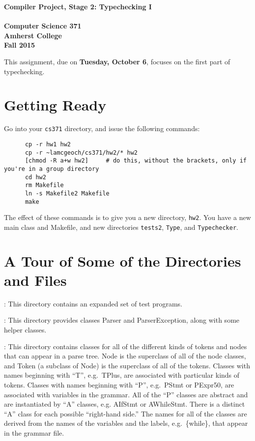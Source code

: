 \documentclass[11pt]{article}
\begin{document}
\begin{center}
\Large \bf Compiler Project, Stage 2: Typechecking  I\\ \mbox{} \\
\large Computer Science 371 \\
\large Amherst College \\
\large Fall 2015
\end{center}

This assignment, due on {\bf Tuesday, October 6}, focuses on the first part of typechecking.

\section{Getting Ready}

Go into your \verb'cs371' directory, and issue the following commands:
\begin{verbatim}
      cp -r hw1 hw2                   
      cp -r ~lamcgeoch/cs371/hw2/* hw2
      [chmod -R a+w hw2]     # do this, without the brackets, only if you're in a group directory 
      cd hw2
      rm Makefile
      ln -s Makefile2 Makefile
      make
\end{verbatim}
The effect of these commands is to give you a new directory, \verb'hw2'.  You have a new main class and Makefile, and new directories \verb'tests2', \verb'Type', and \verb'Typechecker'.

\section{A Tour of Some of the Directories and Files}

:  This directory contains an expanded set of test programs.

\mbox{}\par{}:  This directory provides classes Parser and ParserException, along with some helper classes.

\mbox{}\par{}:  This directory contains classes for all of the different kinds of tokens and nodes that can appear in a parse tree.  Node is the superclass of all of the node classes, and Token (a subclass of Node) is the superclass of all of the tokens.  Classes with names beginning with ``T'', e.g.\ TPlus, are associated with particular kinds of tokens.  Classes with names beginning with ``P'', e.g.\ PStmt or PExpr50, are associated with variables in the grammar.  All of the ``P'' classes are abstract and are instantiated by ``A'' classes, e.g. AIfStmt or AWhileStmt.  There is a distinct ``A'' class for each possible ``right-hand side.''  The names for all of the classes are derived from the names of the variables and the labels, e.g.\ \{while\}, that appear in the grammar file.
\end{document}
